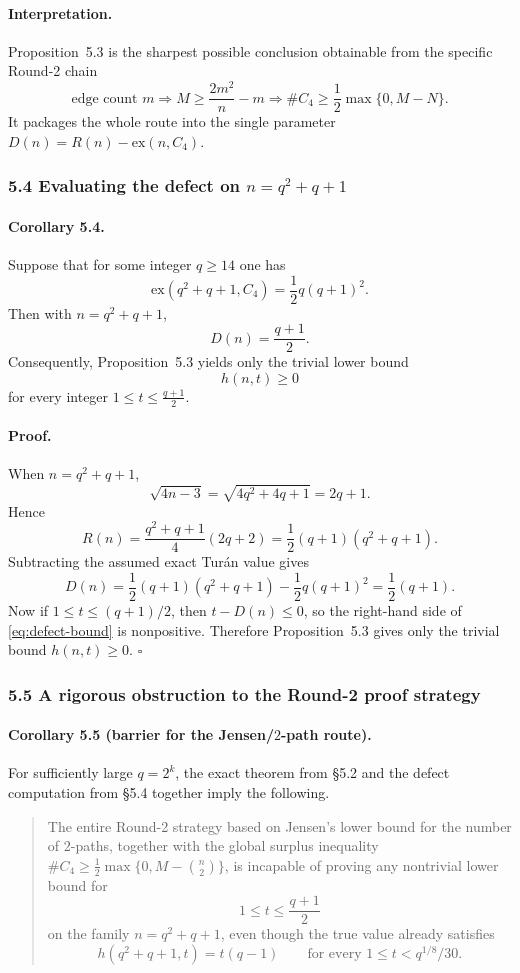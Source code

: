 \paragraph{Interpretation.}
Proposition~5.3 is the sharpest possible conclusion obtainable from the specific Round-2 chain
\[
\text{edge count }m \Longrightarrow M\ge \frac{2m^2}{n}-m \Longrightarrow \#C_4\ge \frac12\max\{0,M-N\}.
\]
It packages the whole route into the single parameter $D(n)=R(n)-\mathrm{ex}(n,C_4)$.

\subsubsection*{5.4 Evaluating the defect on $n=q^2+q+1$}

\paragraph{Corollary 5.4.}
Suppose that for some integer $q\ge 14$ one has
\[
\mathrm{ex}(q^2+q+1,C_4)=\frac12 q(q+1)^2.
\]
Then with $n=q^2+q+1$,
\[
D(n)=\frac{q+1}{2}.
\]
Consequently, Proposition~5.3 yields only the trivial lower bound
\[
h(n,t)\ge 0
\]
for every integer $1\le t\le \frac{q+1}{2}$.

\paragraph{Proof.}
When $n=q^2+q+1$,
\[
\sqrt{4n-3}=\sqrt{4q^2+4q+1}=2q+1.
\]
Hence
\[
R(n)=\frac{q^2+q+1}{4}(2q+2)=\frac12(q+1)(q^2+q+1).
\]
Subtracting the assumed exact Tur\'an value gives
\[
D(n)=\frac12(q+1)(q^2+q+1)-\frac12 q(q+1)^2
=\frac12(q+1).
\]
Now if $1\le t\le (q+1)/2$, then $t-D(n)\le 0$, so the right-hand side of \eqref{eq:defect-bound} is nonpositive. Therefore Proposition~5.3 gives only the trivial bound $h(n,t)\ge 0$. \hfill$\square$

\subsubsection*{5.5 A rigorous obstruction to the Round-2 proof strategy}

\paragraph{Corollary 5.5 (barrier for the Jensen/$2$-path route).}
For sufficiently large $q=2^k$, the exact theorem from \S5.2 and the defect computation from \S5.4 together imply the following.
\begin{quote}
The entire Round-2 strategy based on Jensen's lower bound for the number of $2$-paths, together with the global surplus inequality $\#C_4\ge \frac12\max\{0,M-\binom n2\}$, is incapable of proving any nontrivial lower bound for
\[
1\le t\le \frac{q+1}{2}
\]
on the family $n=q^2+q+1$, even though the true value already satisfies
\[
h(q^2+q+1,t)=t(q-1)
\qquad\text{for every }1\le t<q^{1/8}/30.
\]
\end{quote}

